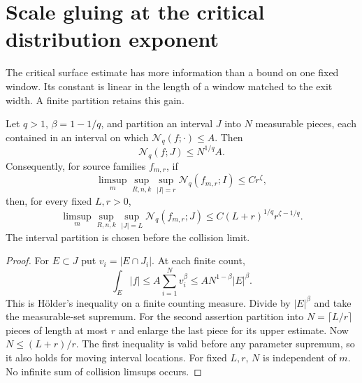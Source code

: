 \section{Scale gluing at the critical distribution exponent}
\label{sec:v91-gluing}
The critical surface estimate has more information than a bound on
one fixed window. Its constant is linear in the length of a window
matched to the exit width. A finite partition retains this gain.

\begin{lemma}
\label{lem:v91-gluing}
Let $q>1$, $\beta=1-1/q$, and partition an interval $J$ into $N$
measurable pieces, each contained in an interval on which
$\mathcal N_q(f;\cdot)\le A$. Then
\begin{equation}\label{eq:v91-gluing}
                 \mathcal N_q(f;J)\le N^{1/q}A.
\end{equation}
Consequently, for source families $f_{m,r}$, if
\[
 \limsup_m\sup_{R,n,k}\sup_{|I|=r}
                 \mathcal N_q(f_{m,r};I)\le C r^\zeta,
\]
then, for every fixed $L,r>0$,
\begin{equation}\label{eq:v91-local-global}
 \limsup_m\sup_{R,n,k}\sup_{|J|=L}
 \mathcal N_q(f_{m,r};J)
       \le C(L+r)^{1/q}r^{\zeta-1/q}.
\end{equation}
The interval partition is chosen before the collision limit.
\end{lemma}
\begin{proof}
For $E\subset J$ put $v_i=|E\cap J_i|$. At each finite count,
\[
 \int_E|f|\le A\sum_{i=1}^N v_i^\beta
             \le A N^{1-\beta}|E|^\beta.
\]
This is H\"older's inequality on a finite counting measure. Divide
by $|E|^\beta$ and take the measurable-set supremum. For the second
assertion partition into $N=\lceil L/r\rceil$ pieces of length at
most $r$ and enlarge the last piece for its upper estimate. Now
$N\le(L+r)/r$. The first inequality is valid before any parameter
supremum, so it also holds for moving interval locations. For fixed
$L,r$, $N$ is independent of $m$. No infinite sum of collision
limsups occurs.
\end{proof}

